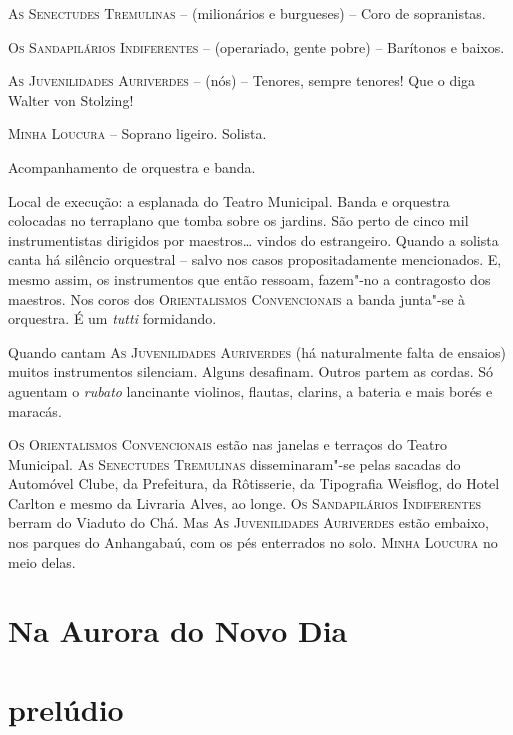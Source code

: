 \textsc{As Senectudes Tremulinas} -- (milionários e burgueses) -- Coro
de sopranistas.

\textsc{Os Sandapilários Indiferentes} -- (operariado, gente pobre) --
Barítonos e baixos.

\textsc{As Juvenilidades Auriverdes} -- (nós) -- Tenores, sempre
tenores! Que o diga Walter von Stolzing!

\textsc{Minha Loucura} -- Soprano ligeiro. Solista.

Acompanhamento de orquestra e banda.
\endgroup

\medskip

\begin{hangparas}{.15in}{1}
Local de execução: a esplanada do Teatro Municipal. Banda e orquestra
colocadas no terraplano que tomba sobre os jardins. São perto de cinco
mil instrumentistas dirigidos por maestros\ldots{} vindos do estrangeiro.
Quando a solista canta há silêncio orquestral -- salvo nos casos
propositadamente mencionados. E, mesmo assim, os instrumentos que então
ressoam, fazem"-no a contragosto dos maestros. Nos coros dos
\textsc{Orientalismos Convencionais} a banda junta"-se à orquestra. É um
\emph{tutti} formidando.

Quando cantam \textsc{As Juvenilidades Auriverdes} (há
naturalmente falta de ensaios) muitos instrumentos silenciam. Alguns
desafinam. Outros partem as cordas. Só aguentam o \emph{rubato}
lancinante violinos, flautas, clarins, a bateria e mais borés e maracás.

\textsc{Os Orientalismos Convencionais} estão nas janelas e terraços do
Teatro Municipal. \textsc{As Senectudes Tremulinas} disseminaram"-se
pelas sacadas do Automóvel Clube, da Prefeitura, da Rôtisserie, da
Tipografia Weisflog, do Hotel Carlton e mesmo da Livraria Alves, ao
longe. \textsc{Os Sandapilários Indiferentes} berram do Viaduto do Chá.
Mas \textsc{As Juvenilidades Auriverdes} estão embaixo, nos parques do
Anhangabaú, com os pés enterrados no solo. \textsc{Minha Loucura} no
meio delas.
\end{hangparas}

\section*{Na Aurora do Novo Dia}

\section*{prelúdio}

